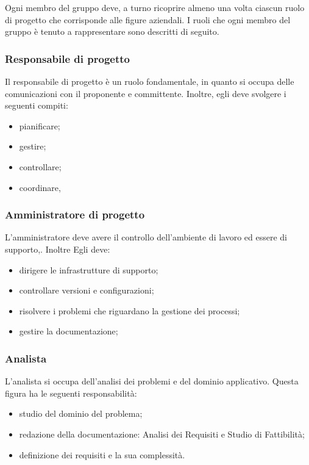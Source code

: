 
Ogni membro del gruppo deve, a turno ricoprire almeno una volta ciascun ruolo di progetto che corrisponde alle figure aziendali. I ruoli che ogni membro del gruppo è tenuto a rappresentare sono descritti di seguito.



\subsubsection{Responsabile di progetto}
Il responsabile di progetto è un ruolo fondamentale, in quanto si occupa delle comunicazioni con il proponente e committente. Inoltre, egli deve svolgere i seguenti compiti:
\begin{itemize}
\item pianificare;
\item gestire;
\item controllare;
\item coordinare,
\end{itemize}

\subsubsection{Amministratore di progetto}
L'amministratore deve avere il controllo dell'ambiente di lavoro ed essere di supporto,. Inoltre Egli deve: 
\begin{itemize}
\item dirigere le infrastrutture di supporto;
\item controllare versioni e configurazioni;
\item risolvere i problemi che riguardano la gestione dei processi;
\item gestire la documentazione;
\end{itemize}


\subsubsection{Analista}
L'analista si occupa dell'analisi dei problemi e del dominio applicativo. Questa figura ha le seguenti responsabilità:
\begin{itemize}
\item studio del dominio del problema; 
\item redazione della documentazione: Analisi dei Requisiti e Studio di Fattibilità;
\item definizione dei requisiti e la sua complessità.
\end{itemize}
